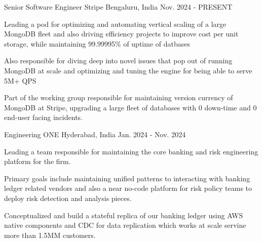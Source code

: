 


\begin{cventries}

\cventry
    {Senior Software Engineer} %
    {Stripe} %
    {Bengaluru, India} %
    {Nov. 2024 - PRESENT} %
    {
      \begin{cvitems} %
        \item {Leading a pod for optimizing and automating vertical scaling of a large MongoDB fleet and also driving efficiency projects to improve cost per unit storage, while maintaining 99.99995\% of uptime of datbases}
        \item {Also responsible for diving deep into novel issues that pop out of running MongoDB at scale and optimizing and tuning the engine for being able to serve 5M+ QPS}
        \item {Part of the working group responsible for maintaining version currency of MongoDB at Stripe, upgrading a large fleet of databases with 0 down-time and 0 end-user facing incidents.}
      \end{cvitems}
    }

\cventry
    {Engineering} %
    {ONE} %
    {Hyderabad, India} %
    {Jan. 2024 - Nov. 2024} %
    {
      \begin{cvitems} %
        \item {Leading a team responsible for maintaining the core banking and risk engineering platform for the firm.}
        \item {Primary goals include maintaining unified patterns to interacting with banking ledger related vendors and also a near no-code platform for risk policy teams to deploy risk detection and analysis pieces.}
        \item {Conceptualized and build a stateful replica of our banking ledger using AWS native components and CDC for data replication which works at scale servine more than 1.5MM customers.}
      \end{cvitems}
    }


\end{cventries}
